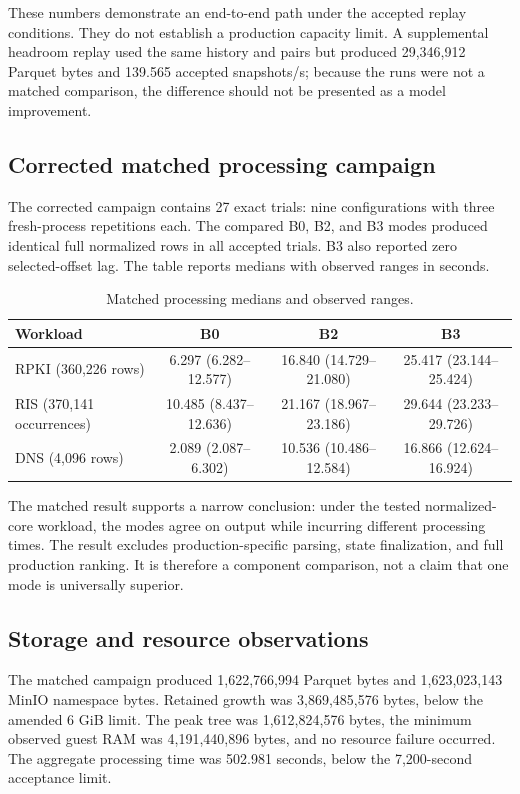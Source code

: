 \documentclass[a4paper,11pt]{article}
\begin{document}
These numbers demonstrate an end-to-end path under the accepted replay conditions. They do not establish a production capacity limit. A supplemental headroom replay used the same history and pairs but produced 29,346,912 Parquet bytes and 139.565 accepted snapshots/s; because the runs were not a matched comparison, the difference should not be presented as a model improvement.

\subsection{Corrected matched processing campaign}

The corrected campaign contains 27 exact trials: nine configurations with three fresh-process repetitions each. The compared B0, B2, and B3 modes produced identical full normalized rows in all accepted trials. B3 also reported zero selected-offset lag. The table reports medians with observed ranges in seconds.

\begin{table}[ht]
\centering
\caption{Matched processing medians and observed ranges.}
\label{tab:matched}
\small
\begin{tabular}{@{}lccc@{}}
\toprule
Workload & B0 & B2 & B3 \\
\midrule
RPKI (360,226 rows) & 6.297 (6.282--12.577) & 16.840 (14.729--21.080) & 25.417 (23.144--25.424) \\
RIS (370,141 occurrences) & 10.485 (8.437--12.636) & 21.167 (18.967--23.186) & 29.644 (23.233--29.726) \\
DNS (4,096 rows) & 2.089 (2.087--6.302) & 10.536 (10.486--12.584) & 16.866 (12.624--16.924) \\
\bottomrule
\end{tabular}
\end{table}

The matched result supports a narrow conclusion: under the tested normalized-core workload, the modes agree on output while incurring different processing times. The result excludes production-specific parsing, state finalization, and full production ranking. It is therefore a component comparison, not a claim that one mode is universally superior.

\subsection{Storage and resource observations}

The matched campaign produced 1,622,766,994 Parquet bytes and 1,623,023,143 MinIO namespace bytes. Retained growth was 3,869,485,576 bytes, below the amended 6 GiB limit. The peak tree was 1,612,824,576 bytes, the minimum observed guest RAM was 4,191,440,896 bytes, and no resource failure occurred. The aggregate processing time was 502.981 seconds, below the 7,200-second acceptance limit.
\end{document}
